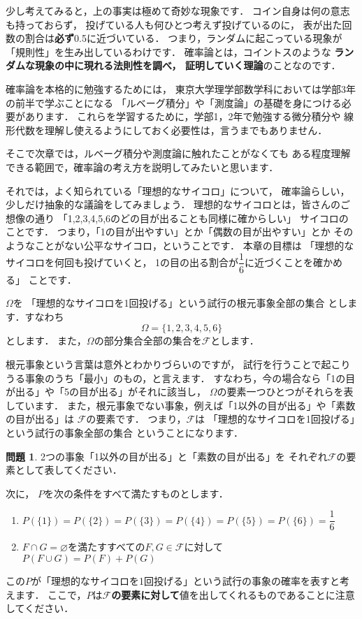 \documentclass[./main]{subfiles} %
\theoremstyle{definition}
\newtheorem{hamadaqst}[hamadadefi]{問題}
\begin{document}
少し考えてみると，上の事実は極めて奇妙な現象です．
コイン自身は何の意志も持っておらず，
投げている人も何ひとつ考えず投げているのに，
表が出た回数の割合は\textbf{必ず}0.5に近づいている．
つまり，ランダムに起こっている現象が「規則性」を生み出しているわけです．
確率論とは，コイントスのような
\textbf{ランダムな現象の中に現れる法則性を調べ，
証明していく理論}のことなのです．

確率論を本格的に勉強するためには，
東京大学理学部数学科においては学部3年の前半で学ぶことになる
「ルベーグ積分」や「測度論」の基礎を身につける必要があります．
これらを学習するために，学部1，2年で勉強する微分積分や
線形代数を理解し使えるようにしておく必要性は，言うまでもありません．

そこで次章では，ルベーグ積分や測度論に触れたことがなくても
ある程度理解できる範囲で，確率論の考え方を説明してみたいと思います．


それでは，よく知られている「理想的なサイコロ」について，
確率論らしい，少しだけ抽象的な議論をしてみましょう．
理想的なサイコロとは，皆さんのご想像の通り
「1,2,3,4,5,6のどの目が出ることも同様に確からしい」
サイコロのことです．
つまり，「1の目が出やすい」とか「偶数の目が出やすい」とか
そのようなことがない公平なサイコロ，ということです．
本章の目標は
「理想的なサイコロを何回も投げていくと，
1の目の出る割合が$\dfrac{1}{6}$に近づくことを確かめる」
ことです．

\label{subsec:finiteprobsp}

$\Omega$を
「理想的なサイコロを1回投げる」という試行の根元事象全部の集合
とします．すなわち
\[ \Omega=\{1,2,3,4,5,6\} \]
とします．
また，$\Omega$の部分集合全部の集合を$\mathcal{F}$とします．

根元事象という言葉は意外とわかりづらいのですが，
試行を行うことで起こりうる事象のうち「最小」のもの，と言えます．
すなわち，今の場合なら「1の目が出る」や「5の目が出る」がそれに該当し，
$\Omega$の要素一つひとつがそれらを表しています．
また，根元事象でない事象，例えば「1以外の目が出る」や「素数の目が出る」は
$\mathcal{F}$の要素です．
つまり，$\mathcal{F}$は
「理想的なサイコロを1回投げる」という試行の事象全部の集合
ということになります．

\begin{hamadaqst}\label{checkofF}
2つの事象「1以外の目が出る」と「素数の目が出る」を
それぞれ$\mathcal{F}$の要素として表してください．
\end{hamadaqst}

次に，
$P$を次の条件をすべて満たすものとします．
\begin{enumerate}
\item $P(\{1\})=P(\{2\})=P(\{3\})=P(\{4\})=P(\{5\})=P(\{6\})=\dfrac{1}{6}$
\item $F\cap G=\varnothing$を満たすすべての$F,G\in\mathcal{F}$に対して
$P(F\cup G)=P(F)+P(G)$
\end{enumerate}
この$P$が「理想的なサイコロを1回投げる」という試行の事象の確率を表すと考えます．
ここで，$P$は\textbf{$\mathcal{F}$の要素に対して}値を出してくれるものであることに注意してください．
\end{document}
